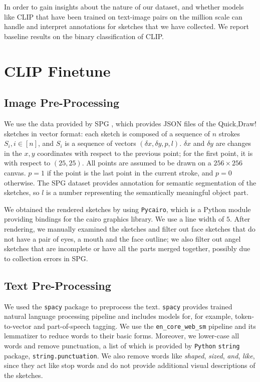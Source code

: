 In order to gain insights about the nature of our dataset, and whether models like CLIP that have been trained on text-image pairs on the million scale can handle and interpret annotations for sketches that we have collected. We report baseline results on the binary classification of CLIP. 

\section{CLIP Finetune}

\subsection{Image Pre-Processing}
We use the data provided by SPG \citep{spg_paper}, which provides JSON files of the Quick,Draw! sketches in vector format: each sketch is composed of a sequence of $n$ strokes $S_i, i \in [n]$, and $S_i$ is a sequence of vectors $(\delta x,\delta y, p, l)$. $\delta x$ and $\delta y$ are changes in the $x,y$ coordinates with respect to the previous point; for the first point, it is with respect to $(25,25)$. All points are assumed to be drawn on a $256 \times 256$ canvas. $p=1$ if the point is the last point in the current stroke, and $p=0$ otherwise. The SPG dataset provides annotation for semantic segmentation of the sketches, so $l$ is a number representing the semantically meaningful object part.  

We obtained the rendered sketches by using \texttt{Pycairo}, which is a Python module providing bindings for the cairo graphics library. We use a line width of $5$. After rendering, we manually examined the sketches and filter out face sketches that do not have a pair of eyes, a mouth and the face outline; we also filter out angel sketches that are incomplete or have all the parts merged together, possibly due to collection errors in SPG.   

\subsection{Text Pre-Processing}
We used the \texttt{spacy} package to preprocess the text. \texttt{spacy} provides trained natural language processing pipeline and includes models for, for example, token-to-vector and part-of-speech tagging. We use the \texttt{en\_core\_web\_sm} pipeline and its lemmatizer to reduce words to their basic forms. Moreover, we lower-case all words and remove punctuation, a list of which is provided by \texttt{Python} \texttt{string} package, \texttt{string.punctuation}. We also remove words like \textit{shaped}, \textit{sized}, \textit{and}, \textit{like}, since they act like stop words and do not provide additional visual descriptions of the sketches.    

